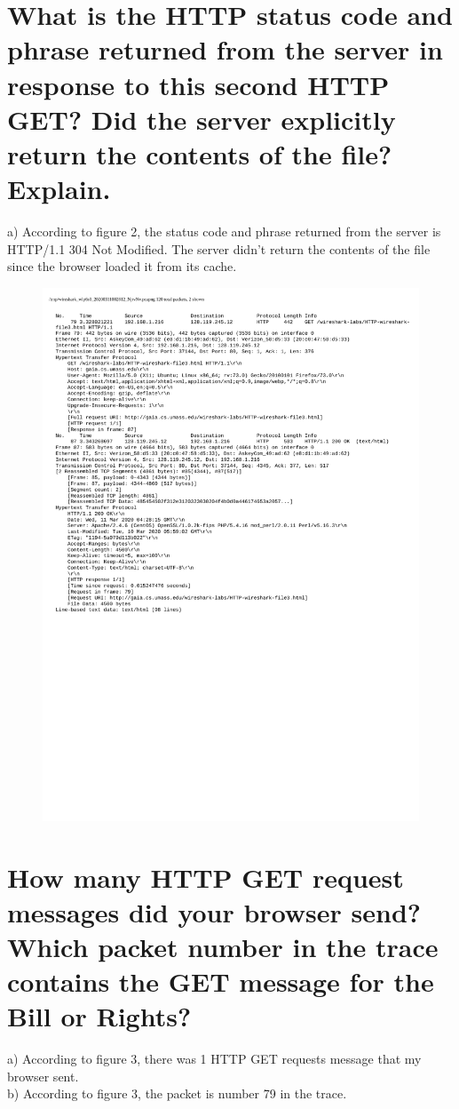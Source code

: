 \documentclass{article}
\begin{document}
\section{What is the HTTP status code and phrase returned from the server in response to
this second HTTP GET? Did the server explicitly return the contents of the file?
Explain.}
a)  According to figure 2, the status code and phrase returned from the server is HTTP/1.1 304 Not
Modified. The server didn’t return the contents of the file since the browser loaded it
from its cache.\\
\begin{figure}[h!]
\centering
\includegraphics[scale=0.65]{Q12-15Output.pdf}
\caption{}
\end{figure}
\section{How many HTTP GET request messages did your browser send? Which packet
number in the trace contains the GET message for the Bill or Rights?}
a)  According to figure 3, there was 1 HTTP GET requests message that my browser sent.\\
\newline b)  According to figure 3, the packet is number 79 in the trace.\\
\end{document}
